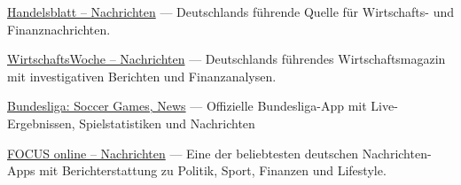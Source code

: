 

\begin{cventries}

\cvaboutme
    {} %
    {} %
    {} %
    {} %
    {
      \begin{cvitems} %
       \item {\href{https://play.google.com/store/apps/details?id=com.handelsblatt.live}{Handelsblatt – Nachrichten} — Deutschlands führende Quelle für Wirtschafts- und Finanznachrichten.}
  \item {\href{https://play.google.com/store/apps/details?id=de.wiwo.one}{WirtschaftsWoche – Nachrichten} — Deutschlands führendes Wirtschaftsmagazin mit investigativen Berichten und  Finanzanalysen.}
  \item {\href{https://play.google.com/store/apps/details?id=com.bundesliga}{Bundesliga: Soccer Games, News} — Offizielle Bundesliga-App mit Live-Ergebnissen, Spielstatistiken und Nachrichten}
  \item {\href{https://play.google.com/store/apps/details?id=de.cellular.focus}{FOCUS online – Nachrichten} — Eine der beliebtesten deutschen Nachrichten-Apps mit Berichterstattung zu Politik, Sport, Finanzen und Lifestyle.}     %
      \end{cvitems}
    }



\end{cventries}
